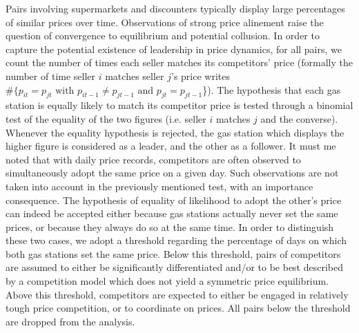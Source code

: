 \documentclass[english]{article}
\begin{document}
Pairs involving supermarkets and discounters typically display large percentages of similar prices over time. Observations of strong price alinement raise the question of convergence to equilibrium and potential collusion. In order to capture the potential existence of leadership in price dynamics, for all pairs, we count the number of times each seller matches its competitors' price (formally the number of time seller $i$ matches seller $j$'s price writes $\#\{p_{it} = p_{jt} \text{ with } p_{it-1} \neq p_{jt-1} \text{ and } p_{jt} = p_{jt-1}$\}). The hypothesis that each gas station is equally likely to match its competitor price is tested through a binomial test of the equality of the two figures (i.e. seller $i$ matches $j$ and the converse). Whenever the equality hypothesis is rejected, the gas station which displays the higher figure is considered as a leader, and the other as a follower. It must me noted that with daily price records, competitors are often observed to simultaneously adopt the same price on a given day. Such observations are not taken into account in the previously mentioned test, with an importance consequence. The hypothesis of equality of likelihood to adopt the other's price can indeed be accepted either because gas stations actually never set the same prices, or because they always do so at the same time. In order to distinguish these two cases, we adopt a threshold regarding the percentage of days on which both gas stations set the same price. Below this threshold, pairs of competitors are assumed to either be significantly differentiated and/or to be best described by a competition model which does not yield a symmetric price equilibrium. Above this threshold, competitors are expected to either be engaged in relatively tough price competition, or to coordinate on prices. All pairs below the threshold are dropped from the analysis.
\end{document}
